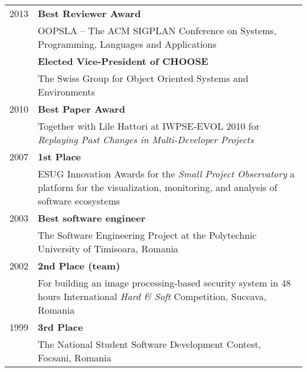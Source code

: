 \newcommand {\award}[3]{{\small #3} & {\bf #1} \\ & #2 \vspace{0.7em}\\ }

\begin{tabular}{p{1cm}p{12cm}}

	\award
		{Best Reviewer Award}
		{OOPSLA -- The ACM SIGPLAN Conference on Systems, Programming, Languages and Applications}
		{2013}

	\award 
		{Elected Vice-President of CHOOSE}
		{The Swiss Group for Object Oriented Systems and Environments}
		{}

	\award
		{Best Paper Award}
		{Together with Lile Hattori at IWPSE-EVOL 2010 for {\em Replaying Past Changes in Multi-Developer Projects}}
		{2010}

	\award
		{1st Place}
		{ESUG Innovation Awards for the {\em Small Project Observatory} a platform for the visualization, monitoring, and analysis of software ecosystems}
		{2007}


	\award
		{Best software engineer}
		{The Software Engineering Project at the Polytechnic University of Timisoara, Romania}
		{2003}

	\award
		{2nd Place (team)}
		{For building an image processing-based security system in 48 hours International {\em Hard \& Soft} Competition, Suceava, Romania}
		{2002}

	\award
		{3rd Place}
		{The National Student Software Development Contest, Focsani, Romania}
		{1999}




\end{tabular}




%

